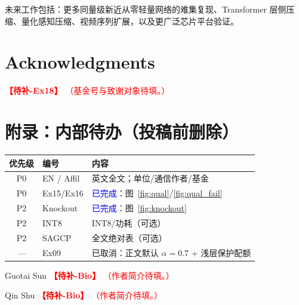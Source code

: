 \documentclass[lettersize,journal]{IEEEtran}
\newcommand{\ExpTodo}[2]{%
  \textcolor{red}{\textbf{【待补-#1】}}%
  \textcolor{red}{（#2）}%
}
\begin{document}
未来工作包括：更多同量级新近从零轻量网络的难集复现、Transformer 层侧压缩、量化感知压缩、视频序列扩展，以及更广泛芯片平台验证。

\section*{Acknowledgments}
\ExpTodo{Ex18}{基金号与致谢对象待填。}

\section*{附录：内部待办（投稿前删除）}
\begin{center}
\footnotesize
\begin{tabular}{@{}clp{7.2cm}@{}}
\toprule
优先级 & 编号 & 内容 \\
\midrule
P0 & EN / Affil & 英文全文；单位/通信作者/基金 \\
P0 & Ex15/Ex16 & \textcolor{blue}{已完成}：图~\ref{fig:qual}/\ref{fig:qual_fail} \\
P2 & Knockout & \textcolor{blue}{已完成}：图~\ref{fig:knockout} \\
P2 & INT8 & INT8/功耗（可选） \\
P2 & SAGCP & 全文绝对表（可选） \\
--- & Ex09 & 已取消：正文默认 $\alpha=0.7$ + 浅层保护配额 \\
\bottomrule
\end{tabular}
\end{center}




\vspace{11pt}

\begin{IEEEbiographynophoto}{Guotai Sun}
\ExpTodo{Bio}{作者简介待填。}
\end{IEEEbiographynophoto}

\begin{IEEEbiographynophoto}{Qin Shu}
\ExpTodo{Bio}{作者简介待填。}
\end{IEEEbiographynophoto}
\end{document}
